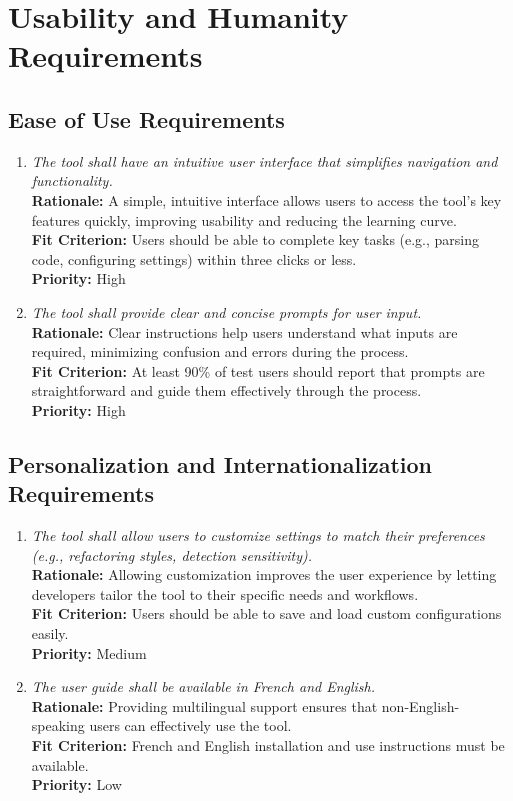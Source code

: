 \documentclass[12pt]{article}
\begin{document}
\section{Usability and Humanity Requirements}
\subsection{Ease of Use Requirements}
\begin{enumerate}[label=UHR-EOU \arabic*., wide=0pt, leftmargin=*]
    \item \emph{The tool shall have an intuitive user interface that simplifies navigation and functionality.}\\
    {\bf Rationale:} A simple, intuitive interface allows users to access the tool's key features quickly, improving usability and reducing the learning curve.\\
    {\bf Fit Criterion:} Users should be able to complete key tasks (e.g., parsing code, configuring settings) within three clicks or less.\\
    {\bf Priority:} High
    \item \emph{The tool shall provide clear and concise prompts for user input.}\\
    {\bf Rationale:} Clear instructions help users understand what inputs are required, minimizing confusion and errors during the process.\\
    {\bf Fit Criterion:} At least 90\% of test users should report that prompts are straightforward and guide them effectively through the process.\\
    {\bf Priority:} High
\end{enumerate}
\subsection{Personalization and Internationalization Requirements}
\begin{enumerate}[label=UHR-PSI \arabic*., wide=0pt, leftmargin=*]
    \item \emph{The tool shall allow users to customize settings to match their preferences (e.g., refactoring styles, detection sensitivity).}\\
    {\bf Rationale:} Allowing customization improves the user experience by letting developers tailor the tool to their specific needs and workflows.\\
    {\bf Fit Criterion:} Users should be able to save and load custom configurations easily.\\
    {\bf Priority:} Medium
    \item \emph{The user guide shall be available in French and English.}\\
    {\bf Rationale:} Providing multilingual support ensures that non-English-speaking users can effectively use the tool.\\
    {\bf Fit Criterion:} French and English installation and use instructions must be available.\\
    {\bf Priority:} Low
\end{enumerate}
\end{document}
